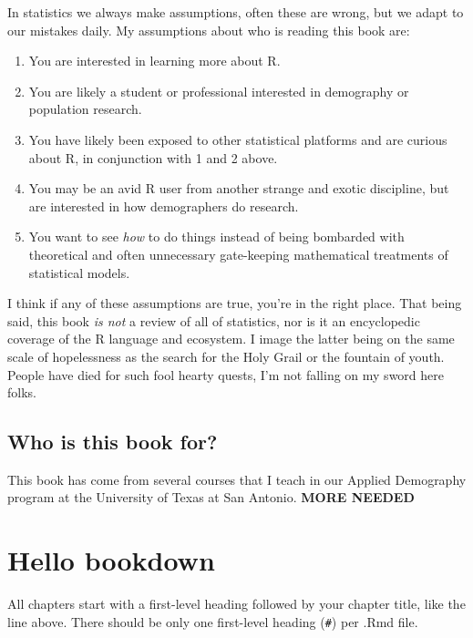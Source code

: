 \documentclass[
]{book}
\begin{document}
In statistics we always make assumptions, often these are wrong, but we
adapt to our mistakes daily. My assumptions about who is reading this
book are:

\begin{enumerate}
\def\labelenumi{\arabic{enumi}.}
\item
  You are interested in learning more about R.
\item
  You are likely a student or professional interested in demography or
  population research.
\item
  You have likely been exposed to other statistical platforms and are
  curious about R, in conjunction with 1 and 2 above.
\item
  You may be an avid R user from another strange and exotic
  discipline, but are interested in how demographers do research.
\item
  You want to see \emph{how} to do things instead of being bombarded with
  theoretical and often unnecessary gate-keeping mathematical
  treatments of statistical models.
\end{enumerate}

I think if any of these assumptions are true, you're in the right place.
That being said, this book \emph{is not} a review of all of statistics, nor
is it an encyclopedic coverage of the R language and ecosystem. I image
the latter being on the same scale of hopelessness as the search for the
Holy Grail or the fountain of youth. People have died for such fool
hearty quests, I'm not falling on my sword here folks.

\hypertarget{who-is-this-book-for}{%
\section{Who is this book for?}\label{who-is-this-book-for}}

This book has come from several courses that I teach in our Applied Demography program at the University of Texas at San Antonio. \textbf{MORE NEEDED}

\hypertarget{hello-bookdown}{%
\chapter{Hello bookdown}\label{hello-bookdown}}

All chapters start with a first-level heading followed by your chapter title, like the line above. There should be only one first-level heading (\texttt{\#}) per .Rmd file.
\end{document}
